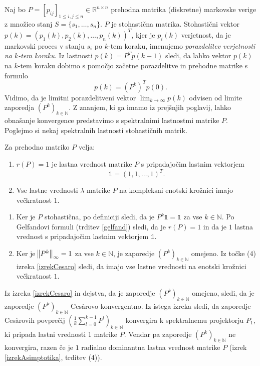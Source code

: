 \documentclass[mat1]{fmfdelo}
\newcommand{\R}{\mathbb R}
\newcommand{\N}{\mathbb N}
\begin{document}
Naj bo $P = [p_{ij}]_{1 \leq i,j \leq n} \in \R^{n \times n}$ prehodna matrika (diskretne) markovske verige z množico stanj $S = \{s_1, \ldots, s_n\}$. $P$ je stohastična matrika. Stohastični vektor $p(k) = \left(p_1(k), p_2(k), \ldots, p_n(k)\right)^T$, kjer je $p_i(k)$ verjetnost, da je markovski proces v stanju $s_i$ po $k$-tem koraku, imenujemo \emph{porazdelitev verjetnosti na $k$-tem koraku}. Iz lastnosti $p(k) = P^T p(k-1)$ sledi, da lahko vektor $p(k)$ na $k$-tem koraku dobimo s pomočjo začetne porazdelitve in prehodne matrike s formulo
\begin{equation}\label{eqKtiKorakMarkov}
    p(k) = (P^k)^T p(0).
\end{equation}
Vidimo, da je limitni porazdelitveni vektor $\lim_{k\rightarrow\infty} p(k)$ odvisen od limite zaporedja $(P^k)_{k\in\N}$. Z znanjem, ki ga imamo iz prejšnjih poglavij, lahko obnašanje konvergence predstavimo s spektralnimi lastnostmi matrike $P$. Poglejmo si nekaj spektralnih lastnosti stohastičnih matrik.
\begin{trditev}
    Za prehodno matriko $P$ velja:
    \begin{enumerate}
        \item $r(P) = 1$ je lastna vrednost matrike $P$ s pripadajočim lastnim vektorjem
        \begin{equation*}
            \mathds{1} = (1, 1, \ldots, 1)^T.
        \end{equation*}
        \item Vse lastne vrednosti $\lambda$ matrike $P$ na kompleksni enotski krožnici imajo večkratnost $1$.
    \end{enumerate}
\end{trditev}
\begin{dokaz}
    \leavevmode
    \begin{enumerate}
        \item Ker je $P$ stohastična, po definiciji sledi, da je $P^k \mathds{1} = \mathds{1}$ za vse $k \in \N$. Po Gelfandovi formuli (trditev \ref{gelfand}) sledi, da je $r(P) = 1$ in da je $1$ lastna vrednost s pripadajočim lastnim vektorjem $\mathds{1}$.
        \item Ker je $\norm{P^k}_\infty = 1$ za vse $k \in \N$, je zaporedje $(P^k)_{k\in\N}$ omejeno. Iz točke (4) izreka \ref{izrekCesaro} sledi, da imajo vse lastne vrednosti na enotski krožnici večkratnost $1$. \qedhere
    \end{enumerate}
\end{dokaz}
Iz izreka \ref{izrekCesaro} in dejstva, da je zaporedje $(P^k)_{k\in\N}$ omejeno, sledi, da je zaporedje $(P^k)_{k\in\N}$ Ces\`arovo konvergentno. Iz istega izreka sledi, da zaporedje Ces\`arovih povprečij $\left(\frac{1}{k} \sum_{l=0}^{k-1} P^l\right)_{k\in\N}$ konvergira k spektralnemu projektorju $P_1$, ki pripada lastni vrednosti $1$ matrike $P$. Vendar pa zaporedje $(P^k)_{k\in\N}$ ne konvergira, razen če je $1$ radialno dominantna lastna vrednost matrike $P$ (izrek \ref{izrekAsimptotika}, trditev (4)).
\end{document}
